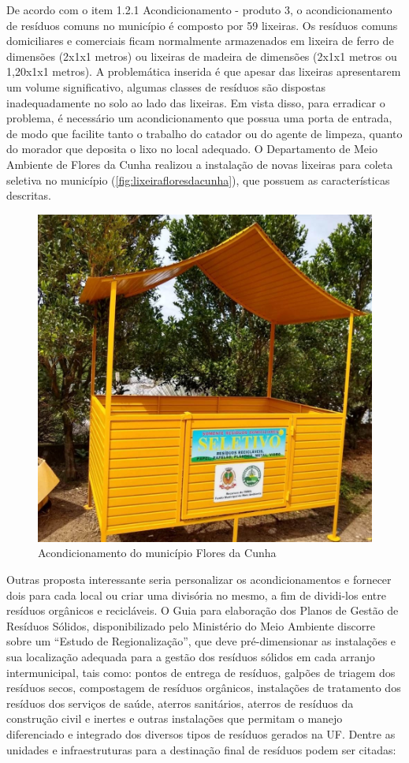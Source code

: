 De acordo com o item 1.2.1 Acondicionamento - produto 3, o acondicionamento de resíduos comuns no município é composto por 59 lixeiras. Os resíduos comuns domiciliares e comerciais ficam normalmente armazenados em lixeira de ferro de dimensões (2x1x1 metros) ou lixeiras de madeira de dimensões (2x1x1 metros ou 1,20x1x1 metros). A problemática inserida é que apesar das lixeiras apresentarem um volume significativo, algumas classes de resíduos são dispostas inadequadamente no solo ao lado das lixeiras. Em vista disso, para erradicar o problema, é necessário um acondicionamento que possua uma porta de entrada, de modo que facilite tanto o trabalho do catador ou do agente de limpeza, quanto do morador que deposita o lixo no local adequado. O Departamento de Meio Ambiente de Flores da Cunha realizou a instalação de novas lixeiras para coleta seletiva no município (\autoref{fig:lixeirafloresdacunha}), que possuem as características descritas.   

\begin{figure}
	\centering
	\includegraphics[width=0.7\linewidth]{produtos/prodquatro/lixeira_floresdacunha}
	\caption{Acondicionamento do município Flores da Cunha}
	\label{fig:lixeirafloresdacunha}
\end{figure}

Outras proposta interessante seria personalizar os acondicionamentos e fornecer dois para cada local ou criar uma divisória no mesmo, a fim de dividi-los entre resíduos orgânicos e recicláveis.
O Guia para elaboração dos Planos de Gestão de Resíduos Sólidos, disponibilizado pelo Ministério do Meio Ambiente discorre sobre um “Estudo de Regionalização”, que deve pré-dimensionar as instalações e sua localização adequada para a gestão dos resíduos sólidos em cada arranjo intermunicipal, tais como: pontos de entrega de resíduos, galpões de triagem dos resíduos secos, compostagem de resíduos orgânicos, instalações de tratamento dos resíduos dos serviços de saúde, aterros sanitários, aterros de resíduos da construção civil e inertes e outras instalações que permitam o manejo diferenciado e integrado dos diversos tipos de resíduos gerados na UF. Dentre as unidades e infraestruturas para a destinação final de resíduos podem ser citadas: 


